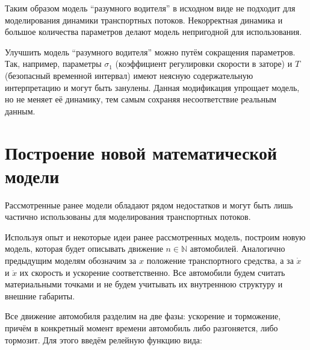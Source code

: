 \documentclass[12pt, a4paper]{extarticle}
\numberwithin{equation}{section}
\numberwithin{figure}{section}
\begin{document}
Таким образом модель ``разумного водителя'' в исходном виде не подходит для моделирования динамики транспортных потоков. Некорректная динамика и большое количества параметров делают модель непригодной для использования.

Улучшить модель ``разумного водителя'' можно путём сокращения параметров. Так, например, параметры $\sigma_1$ (коэффициент регулировки скорости в заторе) и $T$ (безопасный временной интервал) имеют неясную содержательную интерпретацию и могут быть занулены. Данная модификация упрощает модель, но не меняет её динамику, тем самым сохраняя несоответствие реальным данным.

\section{Построение новой математической модели}
Рассмотренные ранее модели обладают рядом недостатков и могут быть лишь частично использованы для моделирования транспортных потоков. 

Используя опыт и некоторые идеи ранее рассмотренных модель, построим новую модель, которая будет описывать движение $n \in \mathbb{N}$ автомобилей. Аналогично предыдущим моделям обозначим за $x$ положение транспортного средства, а за $\dot{x}$ и $\ddot{x}$ их скорость и ускорение соответственно. Все автомобили будем считать материальными точками и не будем учитывать их внутреннюю структуру и внешние габариты.

Все движение автомобиля разделим на две фазы: ускорение и торможение, причём в конкретный момент времени автомобиль либо разгоняется, либо тормозит. Для этого введём релейную функцию вида:
\end{document}
